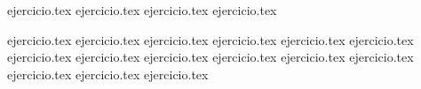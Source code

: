 \begin{enumerate}
    \setcounter{enumi}{40}
    {ejercicio.tex}
{ejercicio.tex}
{ejercicio.tex}
{ejercicio.tex}
\end{enumerate}

\vspace{0.3cm}
\begin{enumerate}
    \setcounter{enumi}{44}
    {ejercicio.tex}
{ejercicio.tex}
{ejercicio.tex}
{ejercicio.tex}
{ejercicio.tex}
{ejercicio.tex}
{ejercicio.tex}
{ejercicio.tex}
{ejercicio.tex}
{ejercicio.tex}
{ejercicio.tex}
{ejercicio.tex}
{ejercicio.tex}
{ejercicio.tex}
{ejercicio.tex}
\end{enumerate}
